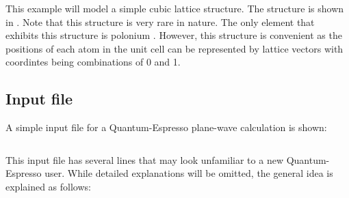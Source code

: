 This example will model a simple cubic lattice structure. The structure is
shown in . Note that this structure is very rare in nature.
The only element that exhibits this structure is polonium \cite{beamer}.
However, this structure is convenient as the positions of each atom in the
unit cell can be represented by lattice vectors with coordintes being
combinations
of 0 and 1.

\subsection{Input file}

A simple input file for a Quantum-Espresso plane-wave calculation is shown:

\begin{tcolorbox}[colback=gray!10, colframe=gray!30, boxrule=0.5pt, breakable]
\begin{center}
  \inputminted[linenos,
  numbersep=8pt]{text}{./calculations/calculations/cu_a2.200.in}
\end{center}
\end{tcolorbox}

This input file has several lines that may look unfamiliar to a new
Quantum-Espresso
user. While detailed explanations will be omitted, the general idea
is explained as
follows:

